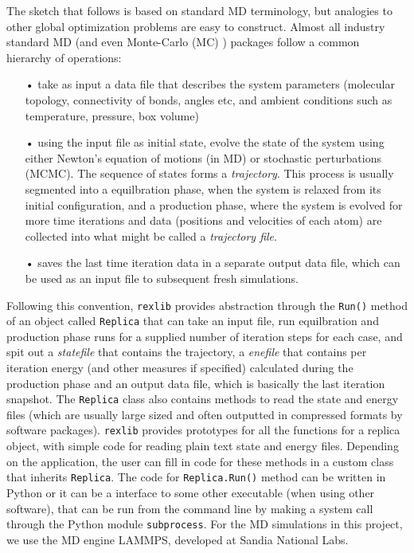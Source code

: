 \documentclass[12pt,letterpaper]{article}
\begin{document}
\noindent The sketch that follows is based on standard MD terminology, but analogies to other global optimization problems are easy to construct. Almost all industry standard MD (and even Monte-Carlo (MC) ) packages follow a common hierarchy of operations:
%
\begin{itemize}
\item[•] take as input a data file that describes the system parameters (molecular topology, connectivity of bonds, angles etc, and ambient conditions such as temperature, pressure, box volume)
\item[•] using the input file as initial state, evolve the state of the system using either Newton's equation of motions (in MD) or stochastic perturbations (MCMC). The sequence of states forms a \textit{trajectory}. This process is usually segmented into a equilbration phase, when the system is relaxed from its initial configuration, and a production phase, where the system is evolved for more time iterations and data (positions and velocities of each atom) are collected into what might be called a \textit{trajectory file}.
\item[•]saves the last time iteration data in a separate output data file, which can be used as an input file to subsequent fresh simulations.
\end{itemize}
%
Following this convention, \texttt{rexlib} provides abstraction through the \texttt{Run()} method of an object called \texttt{Replica} that can take an input file, run equilbration and production phase runs for a supplied number of iteration steps for each case, and spit out a \textit{statefile} that contains the trajectory, a \textit{enefile} that contains per iteration energy (and other measures if specified) calculated during the production phase and an output data file, which is basically the last iteration snapshot. The \texttt{Replica} class also contains methods to read the state and energy files (which are usually large sized and often outputted in compressed formats by software packages). \texttt{rexlib} provides prototypes for all the functions for a replica object, with simple code for reading plain text state and energy files. Depending on the application, the user can fill in code for these methods in a custom class that inherits \texttt{Replica}. The code for \texttt{Replica.Run()} method can be written in Python or it can be a interface to some other executable (when using other software), that can be run from the command line by making a system call through the Python module \texttt{subprocess}. For the MD simulations in this project, we use the MD engine LAMMPS, developed at Sandia National Labs.\cite{lammps}\\
\end{document}
